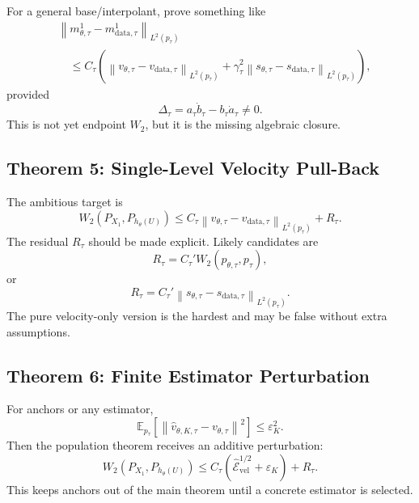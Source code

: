 \documentclass[11pt]{article}
\newcommand{\E}{\mathbb{E}}
\newcommand{\norm}[1]{\left\lVert #1 \right\rVert}
\newcommand{\data}{\mathrm{data}}
\theoremstyle{plain}
\theoremstyle{definition}
\begin{document}
For a general base/interpolant, prove something like
\begin{align}
&\norm{m_{\theta,\tau}^1-m_{\data,\tau}^1}_{L^2(p_\tau)}
\nonumber\\
&\quad \le
C_\tau
\left(
\norm{v_{\theta,\tau}-v_{\data,\tau}}_{L^2(p_\tau)}
+
\gamma_\tau^2
\norm{s_{\theta,\tau}-s_{\data,\tau}}_{L^2(p_\tau)}
\right),
\end{align}
provided
\begin{equation}
\Delta_\tau=a_\tau\dot b_\tau-b_\tau\dot a_\tau
\ne0.
\end{equation}
This is not yet endpoint \(W_2\), but it is the missing algebraic closure.

\subsection{Theorem 5: Single-Level Velocity Pull-Back}

The ambitious target is
\begin{equation}
W_2(P_{X_1},P_{h_\theta(U)})
\le
C_\tau
\norm{v_{\theta,\tau}-v_{\data,\tau}}_{L^2(p_\tau)}
+
R_\tau.
\end{equation}
The residual \(R_\tau\) should be made explicit. Likely candidates are
\begin{equation}
R_\tau
=
C_\tau'
W_2(p_{\theta,\tau},p_\tau),
\end{equation}
or
\begin{equation}
R_\tau
=
C_\tau'
\norm{s_{\theta,\tau}-s_{\data,\tau}}_{L^2(p_\tau)}.
\end{equation}
The pure velocity-only version is the hardest and may be false without extra
assumptions.

\subsection{Theorem 6: Finite Estimator Perturbation}

For anchors or any estimator,
\begin{equation}
\E_{p_\tau}
\left[
\norm{\widehat v_{\theta,K,\tau}-v_{\theta,\tau}}^2
\right]
\le
\varepsilon_K^2.
\end{equation}
Then the population theorem receives an additive perturbation:
\begin{equation}
W_2(P_{X_1},P_{h_\theta(U)})
\le
C_\tau
\left(
\widehat{\mathcal E}_{\mathrm{vel}}^{1/2}
+
\varepsilon_K
\right)
+
R_\tau.
\end{equation}
This keeps anchors out of the main theorem until a concrete estimator is
selected.
\end{document}
